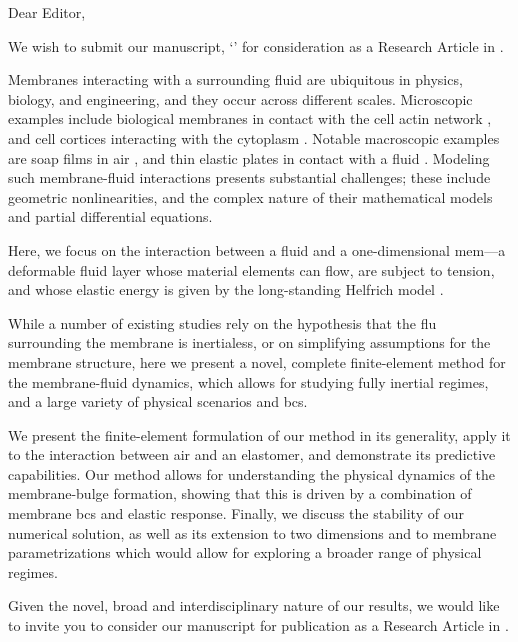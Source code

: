 \documentclass{letter}
\begin{document}
\begin{letter}{}


      \opening{Dear Editor,}
      We wish to submit our manuscript, `\mtitle' for consideration as a Research Article in \myjournal.


      Membranes interacting with a surrounding fluid are ubiquitous in physics, biology, and engineering, and they occur across different scales. Microscopic examples include biological membranes in contact with the cell  actin network \cite{Bassereau_2018}, and cell cortices interacting with the cytoplasm \cite{salbreuxActinCortexMechanics2012}. Notable macroscopic examples are soap films in air \cite{Pugh_2016}, and thin elastic plates in contact with a fluid \cite{landauTheoryElasticity1986}.
      Modeling such membrane-fluid interactions presents substantial challenges; these include  geometric nonlinearities, and the complex nature of their mathematical models and partial differential equations.

      Here, we focus on  the interaction between a fluid and a one-dimensional \acl{mem}---a deformable fluid layer whose material elements can flow, are subject to tension, and whose elastic energy is given by the long-standing Helfrich model \cite{helfrichElasticPropertiesLipid1973}.

      While a number of  existing studies  rely on the hypothesis that the \acl{flu} surrounding the membrane is inertialess, or on simplifying assumptions for the membrane structure,  here we  present a novel, complete finite-element method for the membrane-fluid dynamics, which allows for studying fully inertial regimes, and  a large variety of physical scenarios and \aclp{bc}.

      We present the finite-element formulation of our method in its generality,  apply it to the interaction between air and an elastomer, and demonstrate its predictive capabilities. Our method allows for understanding the physical dynamics of the membrane-bulge formation, showing that this is driven by a combination of membrane \aclp{bc} and elastic response.
      Finally,  we discuss the stability of our numerical solution, as well as its extension to two dimensions and to membrane parametrizations which would allow for exploring a broader range of  physical regimes.

      Given the novel, broad and interdisciplinary nature of our results, we would like to invite  you to consider our manuscript for publication as a Research Article  in \myjournal.


\end{letter}
\end{document}
